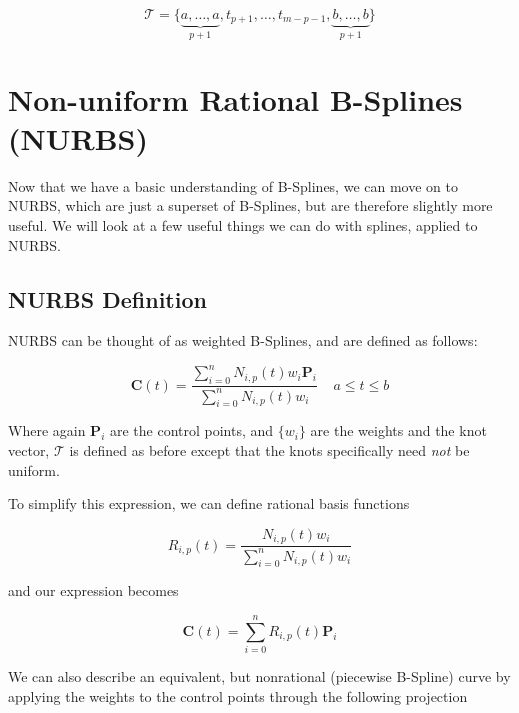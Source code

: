 \begin{equation} \mathcal{T} = \{\underbrace{a,\ldots,a}_{p+1},t_{p+1},\ldots,t_{m-p-1},\underbrace{b,\ldots,b}_{p+1} \}  \end{equation}



\section{Non-uniform Rational B-Splines (NURBS)}
Now that we have a basic understanding of B-Splines, we can move on to NURBS, which are just a superset of B-Splines, but are therefore slightly  more useful. We will look at a few useful things we can do with splines, applied to NURBS.

\subsection{NURBS Definition}
NURBS can be thought of as weighted B-Splines, and are defined as follows:

\begin{equation}\label{eqn:nurbsdef} \textbf{C}(t) = \frac{ \displaystyle \sum^n_{i=0}N_{i,p}(t) w_i \textbf{P}_i }{ \displaystyle \sum^n_{i=0}N_{i,p}(t) w_i }~~~~~a\leq t \leq b \end{equation}  

Where again $\textbf{P}_i$ are the control points, and $\{w_i\}$ are the weights and the knot vector, $\mathcal{T}$ is defined as before except that the knots specifically need \textit{not} be uniform.

To simplify this expression, we can define rational basis functions

\begin{equation} R_{i,p}(t) = \frac{ N_{i,p}(t) w_i } { \displaystyle \sum^n_{i=0}N_{i,p}(t) w_i }\end{equation}  

and our expression becomes

\begin{equation} \textbf{C}(t) = \sum^n_{i=0} R_{i,p}(t) \textbf{P}_i  \end{equation}  


We can also describe an equivalent, but nonrational (piecewise B-Spline) curve by applying the weights to the control points through the following projection

